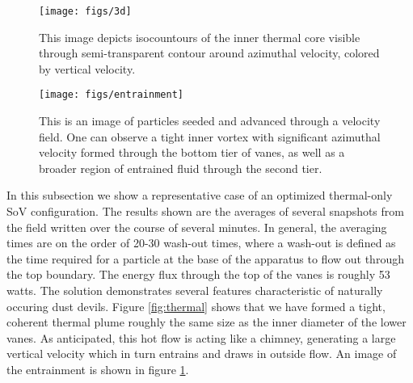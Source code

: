   \begin{figure}[htp]
   
   \centering
   \begin{minipage}{0.47\textwidth}
    \texttt{[image: figs/3d]}
    \caption{This image depicts isocountours of the inner thermal core
    visible through semi-transparent contour around azimuthal velocity,
    colored by vertical velocity. }
   \end{minipage}      
   \label{fig:thermal}  

   \centering   
   \begin{minipage}{0.47\textwidth}
    \texttt{[image: figs/entrainment]}%
    \caption{This is an image of particles seeded and advanced
    through a velocity field. One can observe a tight inner vortex with
    significant azimuthal velocity formed through the bottom tier of
    vanes, as well as a broader region of entrained fluid through the
    second tier.} 
   \end{minipage}   
   \label{fig:entrain}  
  \end{figure}   



In this subsection we show a representative case of an optimized thermal-only SoV
configuration. The results shown are the averages of several snapshots
from the field written over the course of several minutes. In general,
the averaging times are on the order of 20-30 wash-out times, where a
wash-out is defined as the time required for a particle at the base of
the apparatus to flow out through the top boundary. The energy flux
through the top of the vanes is roughly 53 watts. The solution
demonstrates several features characteristic of naturally occuring dust
devils. Figure \ref{fig:thermal} shows that we have formed a tight,
coherent thermal plume roughly the same size as the inner diameter of the
lower vanes. As anticipated, this hot flow is acting like a chimney,
generating a large vertical velocity which in turn entrains and draws in
outside flow. An image of the entrainment is shown in figure
\ref{fig:entrain}. 



